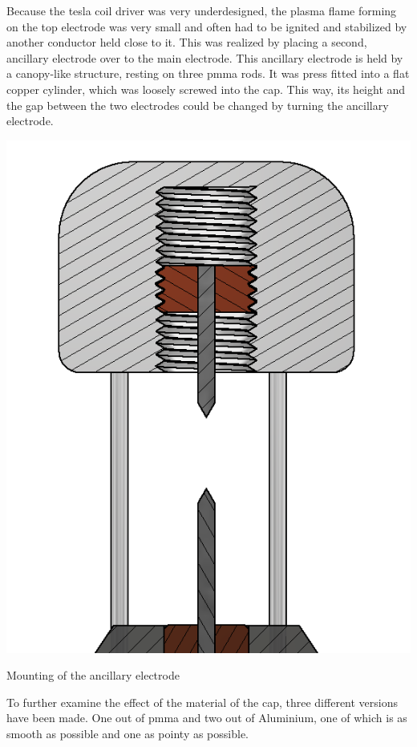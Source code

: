 Because the tesla coil driver was very underdesigned, the plasma flame forming on the top electrode was very small and often had to be ignited and stabilized by another conductor held close to it. This was realized by placing a second, ancillary electrode over to the main electrode. This ancillary electrode is held by a canopy-like structure, resting on three \gls{pmma} rods. It was press fitted into a flat copper cylinder, which was loosely screwed into the cap. This way, its height and the gap between the two electrodes could be changed by turning the ancillary electrode. 

\begin{marginfigure}[-3cm]
    \centering
    \includegraphics[width=\textwidth]{kassandra/resources/mirGehtsSuperDanke.png}
    \caption{Mounting of the ancillary electrode}
    \label{fig:ancillary-electrode}
\end{marginfigure}

To further examine the effect of the material of the cap, three different versions have been made. One out of \gls{pmma} and two out of Aluminium, one of which is as smooth as possible and one as pointy as possible.

